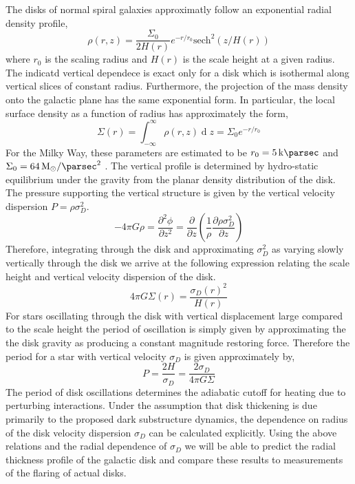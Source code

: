 \documentclass[usenatbib]{mnras}
\renewcommand{\d}[1]{\! \mathrm{d}#1 \:}
\newcommand{\pderiv}[2]{\frac{\partial{#1}}{\partial{#2}}}
\renewcommand{\d}[1]{\ensuremath{\operatorname{d}\!{#1}}}
\begin{document}
\par
The disks of normal spiral galaxies approximatly follow an exponential radial density profile,
\begin{equation}
\rho(r, z) = \frac{\Sigma_0}{2 H(r)} e^{-r/r_0} \mathrm{sech}^2{(z/H(r))} 
\end{equation}
where $r_0$ is the scaling radius and $H(r)$ is the scale height at a given radius. The indicatd vertical dependece is exact only for a disk which is isothermal along vertical slices of constant radius. Furthermore, the projection of the mass density onto the galactic plane has the same exponential form. In particular, the local surface density as a function of radius has approximately the form,
\begin{equation}
\Sigma(r) = \int_{-\infty}^{\infty} \rho(r, z) \d{z} = \Sigma_0 e^{-r / r_0}
\end{equation}
For the Milky Way, these parameters are estimated to be $r_0 = \SI{5}{\kilo \parsec}$ and $\Sigma_0 = \SI{64}{M_{\odot} \per \parsec \squared}$ \citep{dynamical_measurement}. The vertical profile is determined by hydro-static equilibrium under the gravity from the planar density distribution of the disk. The pressure supporting the vertical structure is given by the vertical velocity dispersion $P = \rho \sigma_D^2$. 
\begin{equation}
- 4 \pi G \rho = \frac{\partial^2 \phi}{\partial z^2} = \pderiv{}{z} \left( \frac{1}{\rho} \pderiv{ \rho \sigma_D^2}{z} \right)
\end{equation}  
Therefore, integrating through the disk and approximating $\sigma_D^2$ as varying slowly vertically through the disk we arrive at the following expression relating the scale height and vertical velocity dispersion of the disk.
\begin{equation} \label{scale}
4 \pi G \Sigma(r) = \frac{ \sigma_D(r)^2 }{H(r)}
\end{equation}
For stars oscillating through the disk with vertical displacement large compared to the scale height the period of oscillation is simply given by approximating the the disk gravity as producing a constant magnitude restoring force. Therefore the period for a star with vertical velocity $\sigma_D$ is given approximately by,
\begin{equation}
P = \frac{2 H}{\sigma_D} = \frac{2 \sigma_D}{4 \pi G \Sigma}
\end{equation}
The period of disk oscillations determines the adiabatic cutoff for heating due to perturbing interactions. Under the assumption that disk thickening is due primarily to the proposed dark substructure dynamics, the dependence on radius of the disk velocity dispersion $\sigma_D$ can be calculated explicitly. Using the above relations and the radial dependence of $\sigma_D$ we will be able to predict the radial thickness profile of the galactic disk and compare these results to measurements of the flaring of actual disks.  
\end{document}
